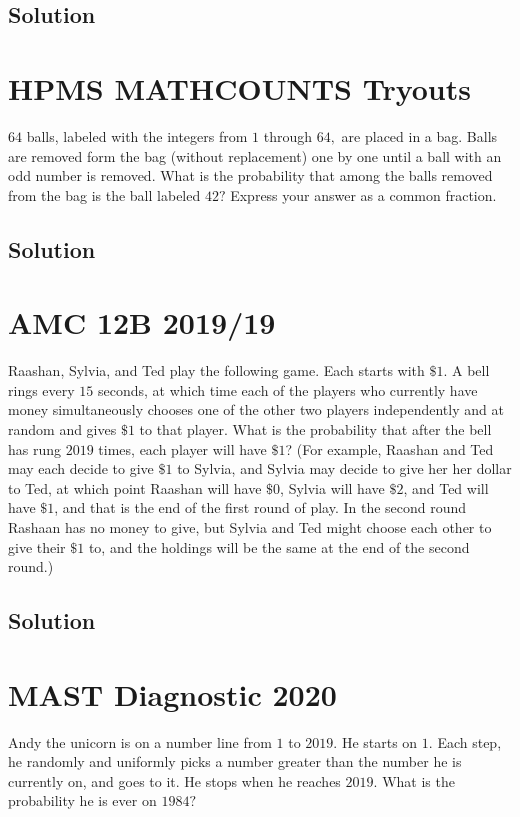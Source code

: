 \documentclass[blue,onecol]{shooting}
\begin{document}
\subsection{Solution}    





\section{HPMS MATHCOUNTS Tryouts} $64$ balls, labeled with the integers from $1$ through $64,$ are placed in a bag. Balls are removed form the bag (without replacement) one by one until a ball with an odd number is removed. What is the probability that among the balls removed from the bag is the ball labeled $42?$ Express your answer as a common fraction.
\subsection{Solution}




\section{AMC 12B 2019/19} Raashan, Sylvia, and Ted play the following game. Each starts with $\$ 1$. A bell rings every $15$ seconds, at which time each of the players who currently have money simultaneously chooses one of the other two players independently and at random and gives $\$1$ to that player. What is the probability that after the bell has rung $2019$ times, each player will have $\$1$? (For example, Raashan and Ted may each decide to give $\$1$ to Sylvia, and Sylvia may decide to give her her dollar to Ted, at which point Raashan will have $\$0$, Sylvia will have $\$2$, and Ted will have $\$1$, and that is the end of the first round of play. In the second round Rashaan has no money to give, but Sylvia and Ted might choose each other to give their $\$1$ to, and the holdings will be the same at the end of the second round.)
\subsection{Solution}    




\section{MAST Diagnostic 2020} Andy the unicorn is on a number line from $1$ to $2019.$ He starts on $1.$ Each step, he randomly and uniformly picks a number greater than the number he is currently on, and goes to it. He stops when he reaches $2019.$ What is the probability he is ever on $1984?$
\end{document}
